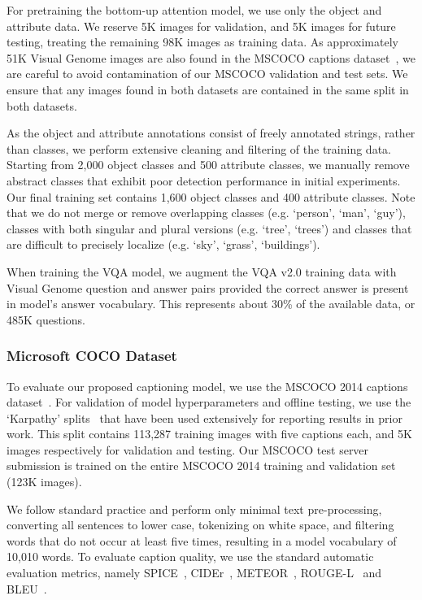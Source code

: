 \documentclass[10pt,twocolumn,letterpaper]{article}
\begin{document}
For pretraining the bottom-up attention model, we use only the object and attribute data. We reserve 5K images for validation, and 5K images for future testing, treating the remaining 98K images as training data. As approximately 51K Visual Genome images are also found in the MSCOCO captions dataset~\cite{Lin2014}, we are careful to avoid contamination of our MSCOCO validation and test sets. We ensure that any images found in both datasets are contained in the same split in both datasets. 

As the object and attribute annotations consist of freely annotated strings, rather than classes, we perform extensive cleaning and filtering of the training data. Starting from 2,000 object classes and 500 attribute classes, we manually remove abstract classes that exhibit poor detection performance in initial experiments. Our final training set contains 1,600 object classes and 400 attribute classes. Note that we do not merge or remove overlapping classes (e.g. `person', `man', `guy'), classes with both singular and plural versions (e.g. `tree', `trees') and classes that are difficult to precisely localize (e.g. `sky', `grass', `buildings').

When training the VQA model, we augment the VQA v2.0 training data with Visual Genome question and answer pairs provided the correct answer is present in model's answer vocabulary. This represents about 30\% of the available data, or 485K questions.

\subsubsection{Microsoft COCO Dataset}

To evaluate our proposed captioning model, we use the MSCOCO 2014 captions dataset~\cite{Lin2014}. For validation of model hyperparameters and offline testing, we use the `Karpathy' splits~\cite{neuraltalk} that have been used extensively for reporting results in prior work. This split contains 113,287 training images with five captions each, and 5K images respectively for validation and testing. Our MSCOCO test server submission is trained on the entire MSCOCO 2014 training and validation set (123K images). 

We follow standard practice and perform only minimal text pre-processing, converting all sentences to lower case, tokenizing on white space, and filtering words that do not occur at least five times, resulting in a model vocabulary of 10,010 words. To evaluate caption quality, we use the standard automatic evaluation metrics, namely SPICE~\cite{spice2016}, CIDEr~\cite{Vedantam2015}, METEOR~\cite{meteor-wmt:2014}, ROUGE-L~\cite{Lin2004} and BLEU~\cite{Papineni2002}.
\end{document}

